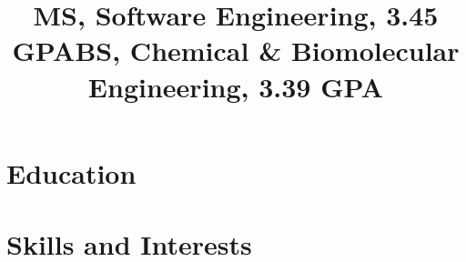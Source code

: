 \documentclass[12pt]{res} %
\begin{document}
\begin{resume}
        \section{Education}
        \vspace{2pt}

        \title{\textbf{MS, Software Engineering, 3.45 GPA}}
        \begin{position}
            \vspace{-14pt}
        \end{position}
        \vspace{-10pt}

        \title{\textbf{BS, Chemical \& Biomolecular Engineering, 3.39 GPA}}
        \begin{position}
          \vspace{-14pt}
        \end{position}
        \vspace{-10pt}

        \section{Skills and Interests}
          \vspace{3pt}


\end{resume}
\end{document}
